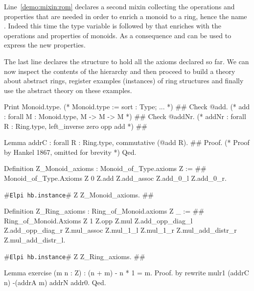 \documentclass[a4paper,UKenglish,cleveref, autoref]{lipics-v2019}
\newcommand{\mixin}{mixin}
\newcommand{\hbinstance}{{\tt\color{dkgreen}Elpi hb.instance}}
\theoremstyle{implem}
\theoremstyle{implem}
\theoremstyle{command}
\begin{document}
Line~\ref{demo:mixin:rom} declares a second \mixin{} collecting the operations
and properties that are needed in order to enrich a monoid to a ring, hence
the name . Indeed this time the type variable 
is followed by  that enriches
 with the operations and properties of monoids. As a consequence
 and  can be used to express the new properties.

The last line declares the  structure to hold all the axioms declared
so far. We can now inspect the contents of the hierarchy and then
proceed to build a theory about abstract rings,
register examples (instances) of ring structures
and finally use the abstract theory on these examples.

\begin{coqcode}
Print Monoid.type. (* Monoid.type  :=  { sort : Type;  ... }                           *) #\label{demo:theory:print:type}#
Check @add.        (* add          :   forall M : Monoid.type, M -> M -> M             *) #\label{demo:theory:check:add}#
Check @addNr.      (* addNr        :   forall R : Ring.type, left_inverse zero opp add *) #\label{demo:theory:check:addNr}#

Lemma addrC : forall R : Ring.type, commutative (@add R).                       #\label{demo:theory:state:addrC}#
Proof. (* Proof by Hankel 1867, omitted for brevity *) Qed.

Definition Z_Monoid_axioms : Monoid_of_Type.axioms Z :=                         #\label{demo:theory:z:monoid:axioms}#
  Monoid_of_Type.Axioms Z 0 Z.add Z.add_assoc Z.add_0_l Z.add_0_r.

#\hbinstance{}# Z Z_Monoid_axioms.                                            #\label{demo:theory:z:monoid:canonical}#

Definition Z_Ring_axioms : Ring_of_Monoid.axioms Z _ :=                        #\label{demo:theory:z:ring:axioms}#
  Ring_of_Monoid.Axioms Z 1 Z.opp Z.mul
    Z.add_opp_diag_l Z.add_opp_diag_r Z.mul_assoc Z.mul_1_l Z.mul_1_r
    Z.mul_add_distr_r Z.mul_add_distr_l.

#\hbinstance{}# Z Z_Ring_axioms.                                              #\label{demo:theory:z:ring:canonical}#

Lemma exercise (m n : Z) : (n + m) - n * 1 = m.
Proof. by rewrite mulr1 (addrC n) -(addrA m) addrN addr0. Qed.
\end{coqcode}
\end{document}
